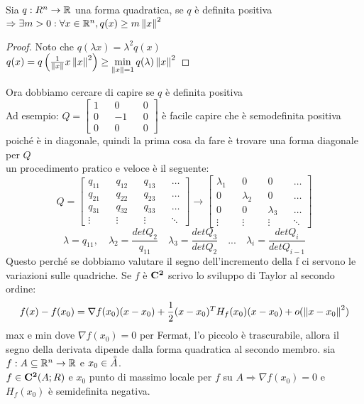 \proposition
Sia $q:R^n\rightarrow \mathbb{R}$ una forma quadratica, se $q$ è definita positiva $\Rightarrow \exists m>0: \forall x \in \mathbb{R}^n, q(x)\ge m\left\|x\right\|^2$
\begin{proof}
	Noto che $q(\lambda x)=\lambda^2q(x)$\\
	$q(x)=q\left(\frac{1}{\left\|x\right\|}x\left\|x\right\|^2\right)\ge\min\limits_{\left\|x\right\|=1}q(\lambda)\left\|x\right\|^2$
\end{proof}
Ora dobbiamo cercare di capire se $q$ è definita positiva\\
Ad esempio: $Q=\begin{bmatrix}1&&0&&0\\0&&-1&&0\\0&&0&&0\end{bmatrix}$ è facile capire che è semodefinita positiva poiché è in diagonale, quindi la prima cosa da fare è trovare una forma diagonale per $Q$\\
un procedimento pratico e veloce è il seguente:\\
\[Q=\begin{bmatrix}q_{11}&&q_{12}&&q_{13}&&\ldots\\q_{21}&&q_{22}&&q_{23}&&\ldots\\q_{31}&&q_{32}&&q_{33}&&\ldots\\\vdots&&\vdots&&\vdots&&\ddots\end{bmatrix}\rightarrow\begin{bmatrix}\lambda_{1}&&0&&0&&\ldots\\0&&\lambda_{2}&&0&&\ldots\\0&&0&&\lambda_{3}&&\ldots\\\vdots&&\vdots&&\vdots&&\ddots\end{bmatrix}\]
\[\lambda=q_{11},\quad\lambda_{2}=\frac{detQ_2}{q_11}\quad\lambda_{3}=\frac{detQ_3}{detQ_2}\quad ...\quad \lambda_{i}=\frac{detQ_i}{detQ_{i-1}}\]
Questo perché se dobbiamo valutare il segno dell'incremento della f ci servono le variazioni sulle quadriche. Se $f$ è $\mathbf{C^{2}}$ scrivo lo sviluppo di Taylor al secondo ordine:\\
\[f(x)-f(x_0)=\nabla f(x_0)(x-x_0)+\frac{1}{2}(x-x_0)^TH_f(x_0)(x-x_0)+o(\left\|x-x_0\right\|^2)\]
max e min dove $\nabla f(x_0)=0$ per Fermat, l'o piccolo è trascurabile, allora il segno della derivata dipende dalla forma quadratica al secondo membro.
\proposition
sia $f:A\subseteq \mathbb{R}^n\rightarrow \mathbb{R}$ e $x_0\in\accentset{\circ}{A}$.\\
$f\in \mathbf{C^{2}}(A;R)$ e $x_0$ punto di massimo locale per $f$ su $A\Rightarrow\nabla f(x_0)=0$ e $H_f(x_0)$ è semidefinita negativa.

